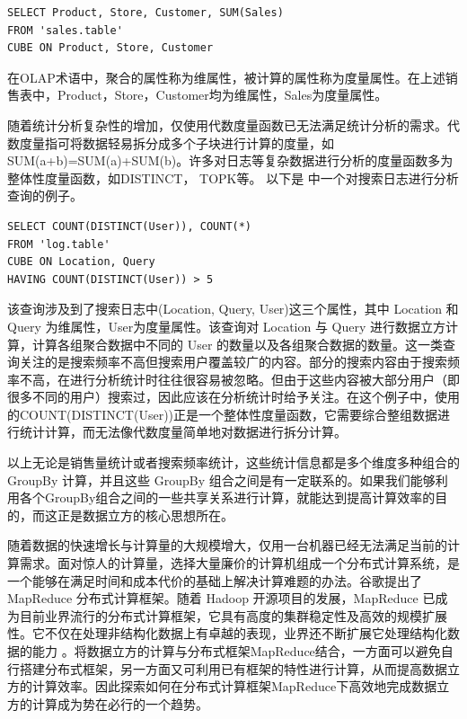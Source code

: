 \begin{verbatim} 
SELECT Product, Store, Customer, SUM(Sales)
FROM 'sales.table'
CUBE ON Product, Store, Customer
\end{verbatim}

在OLAP术语中，聚合的属性称为维属性，被计算的属性称为度量属性。在上述销售表中，Product，Store，Customer均为维属性，Sales为度量属性。

随着统计分析复杂性的增加，仅使用代数度量函数已无法满足统计分析的需求。代数度量指可将数据轻易拆分成多个子块进行计算的度量，如SUM(a+b)=SUM(a)+SUM(b)。许多对日志等复杂数据进行分析的度量函数多为整体性度量函数，如DISTINCT， TOPK等。 以下是 \cite{nandi2011distributed}  中一个对搜索日志进行分析查询的例子。

\begin{verbatim} 
SELECT COUNT(DISTINCT(User)), COUNT(*)
FROM 'log.table'
CUBE ON Location, Query
HAVING COUNT(DISTINCT(User)) > 5
\end{verbatim}

该查询涉及到了搜索日志中(Location, Query, User)这三个属性，其中 Location 和 Query 为维属性，User为度量属性。该查询对 Location 与 Query 进行数据立方计算，计算各组聚合数据中不同的 User 的数量以及各组聚合数据的数量。这一类查询关注的是搜索频率不高但搜索用户覆盖较广的内容。部分的搜索内容由于搜索频率不高，在进行分析统计时往往很容易被忽略。但由于这些内容被大部分用户（即很多不同的用户）搜索过，因此应该在分析统计时给予关注。在这个例子中，使用的COUNT(DISTINCT(User))正是一个整体性度量函数，它需要综合整组数据进行统计计算，而无法像代数度量简单地对数据进行拆分计算。%

以上无论是销售量统计或者搜索频率统计，这些统计信息都是多个维度多种组合的 GroupBy 计算，并且这些 GroupBy 组合之间是有一定联系的。如果我们能够利用各个GroupBy组合之间的一些共享关系进行计算，就能达到提高计算效率的目的，而这正是数据立方的核心思想所在。

随着数据的快速增长与计算量的大规模增大，仅用一台机器已经无法满足当前的计算需求。面对惊人的计算量，选择大量廉价的计算机组成一个分布式计算系统，是一个能够在满足时间和成本代价的基础上解决计算难题的办法。谷歌提出了 MapReduce \cite{dean2008mapreduce}分布式计算框架。随着 Hadoop \cite{hadoop}开源项目的发展，MapReduce 已成为目前业界流行的分布式计算框架，它具有高度的集群稳定性及高效的规模扩展性。它不仅在处理非结构化数据上有卓越的表现，业界还不断扩展它处理结构化数据的能力 \cite{hbase} \cite{abouzeid2009hadoopdb} \cite{buck2011scihadoop} \cite{pig} \cite{hive}。将数据立方的计算与分布式框架MapReduce结合，一方面可以避免自行搭建分布式框架，另一方面又可利用已有框架的特性进行计算，从而提高数据立方的计算效率。因此探索如何在分布式计算框架MapReduce下高效地完成数据立方的计算成为势在必行的一个趋势。



